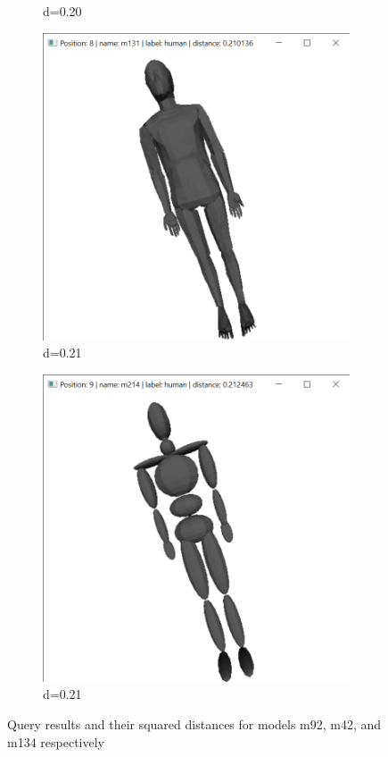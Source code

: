 \documentclass{bigdata}
\begin{document}
\begin{figure}[h!]
\begin{subfigure}[b]{0.09\linewidth}
    \caption*{d=0.20}
  \end{subfigure}
  \begin{subfigure}[b]{0.09\linewidth}
    \includegraphics[width=\linewidth]{Pictures/Evaluation/m134/pos8.png}
    \caption*{d=0.21}
  \end{subfigure}
  \begin{subfigure}[b]{0.09\linewidth}
    \includegraphics[width=\linewidth]{Pictures/Evaluation/m134/pos9.png}
    \caption*{d=0.21}
  \end{subfigure}
  \caption{Query results and their squared distances for models m92, m42, and m134 respectively}
  \label{fig:bunny}
\end{figure}
\end{document}

